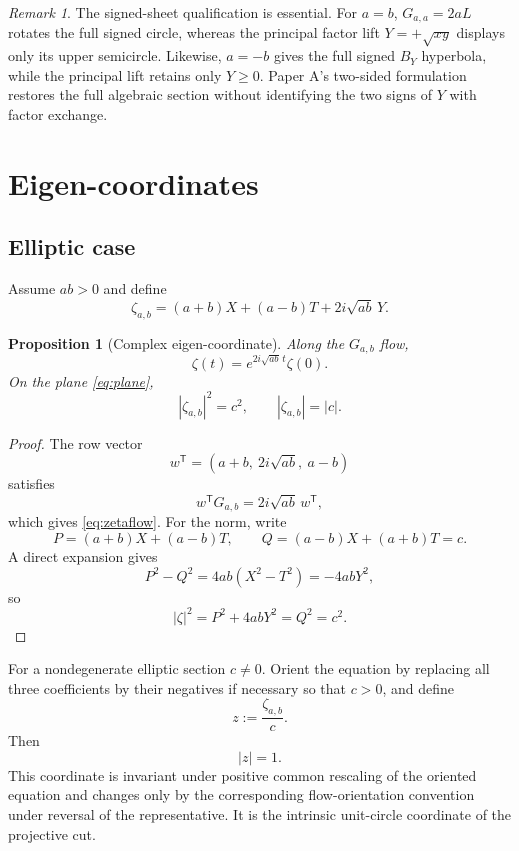 \documentclass[11pt]{amsart}
\newtheorem{proposition}[theorem]{Proposition}
\theoremstyle{remark}
\newtheorem*{remark}{Remark}
\begin{document}
\begin{remark}
The signed-sheet qualification is essential.  For $a=b$, $G_{a,a}=2aL$ rotates the full signed circle, whereas the principal factor lift $Y=+\sqrt{xy}$ displays only its upper semicircle.  Likewise, $a=-b$ gives the full signed $B_Y$ hyperbola, while the principal lift retains only $Y\ge0$.  Paper A's two-sided formulation restores the full algebraic section without identifying the two signs of $Y$ with factor exchange.
\end{remark}

\section{Eigen-coordinates}

\subsection{Elliptic case}
Assume $ab>0$ and define
\begin{equation}\label{eq:zeta}
\zeta_{a,b}
=(a+b)X+(a-b)T+2i\sqrt{ab}\,Y.
\end{equation}

\begin{proposition}[Complex eigen-coordinate]\label{prop:zeta}
Along the $G_{a,b}$ flow,
\begin{equation}\label{eq:zetaflow}
\zeta(t)=e^{2i\sqrt{ab}\,t}\zeta(0).
\end{equation}
On the plane \eqref{eq:plane},
\begin{equation}\label{eq:zetanorm}
\boxed{|\zeta_{a,b}|^2=c^2,\qquad |\zeta_{a,b}|=|c|.}
\end{equation}
\end{proposition}

\begin{proof}
The row vector
\[
w^{\mathsf T}=(a+b,\ 2i\sqrt{ab},\ a-b)
\]
satisfies
\[
w^{\mathsf T}G_{a,b}=2i\sqrt{ab}\,w^{\mathsf T},
\]
which gives \eqref{eq:zetaflow}.  For the norm, write
\[
P=(a+b)X+(a-b)T,
\qquad
Q=(a-b)X+(a+b)T=c.
\]
A direct expansion gives
\[
P^2-Q^2
=4ab(X^2-T^2)
=-4abY^2,
\]
so
\[
|\zeta|^2=P^2+4abY^2=Q^2=c^2.
\]
\end{proof}

For a nondegenerate elliptic section $c\ne0$.  Orient the equation by replacing all three coefficients by their negatives if necessary so that $c>0$, and define
\begin{equation}\label{eq:zprojective}
\boxed{z:=\frac{\zeta_{a,b}}{c}.}
\end{equation}
Then
\[
|z|=1.
\]
This coordinate is invariant under positive common rescaling of the oriented equation and changes only by the corresponding flow-orientation convention under reversal of the representative.  It is the intrinsic unit-circle coordinate of the projective cut.
\end{document}
